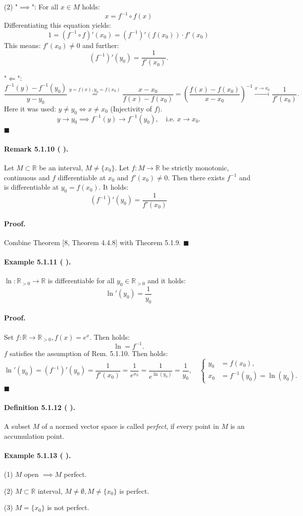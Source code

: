 \documentclass[12pt]{article}
\newcommand{\R}{\mathbb{R}}
\newcommand{\NumberedDefinition}[3]{%
\paragraph*{Definition #1 ( #2 ).} #3\par}
\newcommand{\NumberedRemark}[3]{%
\paragraph*{Remark #1 ( #2 ).} #3\par}
\newcommand{\NumberedExample}[3]{%
\paragraph*{Example #1 ( #2 ).} #3\par}
\begin{document}
(2) "$\implies$": For all $x \in M$ holds:
\[
x = f^{-1} \circ f(x)
\]
Differentiating this equation yields:
\[
1 = (f^{-1} \circ f)'(x_0) = (f^{-1})'(f(x_0)) \cdot f'(x_0)
\]
This means: $f'(x_0) \neq 0$ and further:
\[
(f^{-1})'(y_0) = \frac{1}{f'(x_0)}.
\]

"$\Longleftarrow$":
\[
\frac{f^{-1}(y) - f^{-1}(y_0)}{y - y_0} \stackrel{y=f(x), y_0=f(x_0)}{=} \frac{x - x_0}{f(x) - f(x_0)} = \left( \frac{f(x) - f(x_0)}{x - x_0} \right)^{-1} \xrightarrow{x \to x_0} \frac{1}{f'(x_0)}.
\]
Here it was used: $y \neq y_0 \iff x \neq x_0$ (Injectivity of $f$).
\[
y \to y_0 \implies f^{-1}(y) \to f^{-1}(y_0), \quad \text{i.e. } x \to x_0.
\]
\hfill $\blacksquare$

\NumberedRemark{5.1.10}{}{Let $M \subset \R$ be an interval, $M \neq \{x_0\}$. Let $f : M \to \R$ be strictly monotonic, continuous and $f$ differentiable at $x_0$ and $f'(x_0) \neq 0$. Then there exists $f^{-1}$ and is differentiable at $y_0 = f(x_0)$. It holds:
\[
(f^{-1})'(y_0) = \frac{1}{f'(x_0)}
\]
}

\paragraph*{Proof.} Combine Theorem [8, Theorem 4.4.8] with Theorem 5.1.9. \hfill $\blacksquare$

\NumberedExample{5.1.11}{}{$\ln : \R_{>0} \to \R$ is differentiable for all $y_0 \in \R_{>0}$ and it holds:
\[
\ln'(y_0) = \frac{1}{y_0}
\]
}

\paragraph*{Proof.} Set $f : \R \to \R_{>0}, f(x) = e^x$. Then holds:
\[
\ln = f^{-1}.
\]
$f$ satisfies the assumption of Rem. 5.1.10. Then holds:
\[
\ln'(y_0) = (f^{-1})'(y_0) = \frac{1}{f'(x_0)} = \frac{1}{e^{x_0}} = \frac{1}{e^{\ln(y_0)}} = \frac{1}{y_0}, \quad
\left\{
\begin{aligned}
y_0 &= f(x_0), \\
x_0 &= f^{-1}(y_0) = \ln(y_0).
\end{aligned}
\right.
\]
\hfill $\blacksquare$

\NumberedDefinition{5.1.12}{}{A subset $M$ of a normed vector space is called \textit{perfect}, if every point in $M$ is an accumulation point.}

\NumberedExample{5.1.13}{}{
(1) $M$ open $\implies M$ perfect.
\par
(2) $M \subset \R$ interval, $M \neq \emptyset, M \neq \{x_0\}$ is perfect.
\par
(3) $M = \{x_0\}$ is not perfect.
}
\end{document}
